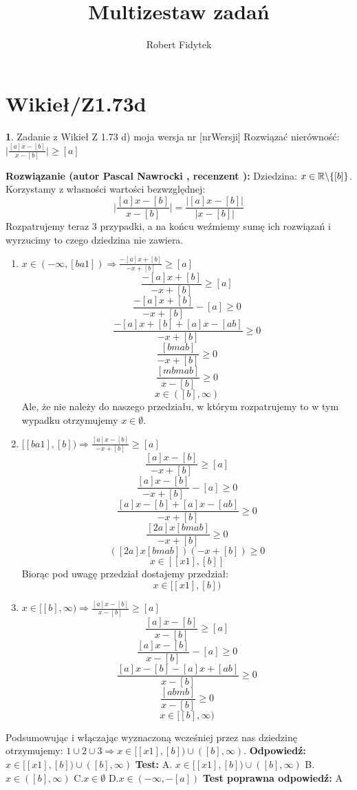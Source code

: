 \documentclass[12pt, a4paper]{article}
\title{Multizestaw zadań}
\author{Robert Fidytek}
\date{}
\theoremstyle{definition} %
\newtheorem{zad}{}
\newcommand{\kategoria}[1]{\section{#1}} %
\newcommand{\zadStart}[1]{\begin{zad}#1\newline} %
\newcommand{\zadStop}{\end{zad}}   %
\newcommand{\rozwStart}[2]{\noindent \textbf{Rozwiązanie (autor #1 , recenzent #2): }\newline} %
\newcommand{\rozwStop}{\newline}                                            %
\newcommand{\odpStart}{\noindent \textbf{Odpowiedź:}\newline}    %
\newcommand{\odpStop}{\newline}                                             %
\newcommand{\testStart}{\noindent \textbf{Test:}\newline} %
\newcommand{\testStop}{\newline} %
\newcommand{\kluczStart}{\noindent \textbf{Test poprawna odpowiedź:}\newline} %
\newcommand{\kluczStop}{\newline} %
\begin{document}
\maketitle


\kategoria{Wikieł/Z1.73d}
\zadStart{Zadanie z Wikieł Z 1.73 d) moja wersja nr [nrWersji]}
Rozwiązać nierówność: $\big|\frac{[a]x-[b]}{x-[b]}\big|\geq[a]$
\zadStop
\rozwStart{Pascal Nawrocki}{}
Dziedzina: $x\in\mathbb{R}\symbol{92}\{[b]\}$.
Korzystamy z własności wartości bezwzględnej:
$$\bigg|\frac{[a]x-[b]}{x-[b]}\bigg|=\frac{|[a]x-[b]|}{|x-[b]|}$$
Rozpatrujemy teraz 3 przypadki, a na końcu weźmiemy sumę ich rozwiązań i wyrzucimy to czego dziedzina nie zawiera.

\begin{enumerate}
\item $x\in(-\infty,[ba1])\Rightarrow\frac{-[a]x+[b]}{-x+[b]}\geq[a]$
$$\frac{-[a]x+[b]}{-x+[b]}\geq[a]$$
$$\frac{-[a]x+[b]}{-x+[b]}-[a]\geq0$$
$$\frac{-[a]x+[b]+[a]x-[ab]}{-x+[b]}\geq0$$
$$\frac{[bmab]}{-x+[b]}\geq0$$
$$\frac{[mbmab]}{x-[b]}\geq0$$
$$x\in([b],\infty)$$
Ale, że nie należy do naszego przedziału, w którym rozpatrujemy to w tym wypadku otrzymujemy $x\in\emptyset$.

\item $ [[ba1],[b])\Rightarrow\frac{[a]x-[b]}{-x+[b]}\geq[a]$
$$\frac{[a]x-[b]}{-x+[b]}\geq[a]$$
$$\frac{[a]x-[b]}{-x+[b]}-[a]\geq0$$
$$\frac{[a]x-[b]+[a]x-[ab]}{-x+[b]}\geq0$$
$$\frac{[2a]x[bmab]}{-x+[b]}\geq0$$
$$([2a]x[bmab])(-x+[b])\geq0$$
$$x\in[[x1],[b]]$$
Biorąc pod uwagę przedział dostajemy przedział:
$$x\in[[x1],[b])$$

\item $x\in[[b],\infty)\Rightarrow\frac{[a]x-[b]}{x-[b]}\geq[a]$
$$\frac{[a]x-[b]}{x-[b]}\geq[a]$$
$$\frac{[a]x-[b]}{x-[b]}-[a]\geq0$$
$$\frac{[a]x-[b]-[a]x+[ab]}{x-[b]}\geq0$$
$$\frac{[abmb]}{x-[b]}\geq0$$
$$x\in[[b],\infty)$$
\end{enumerate}
Podsumowując i włączając wyznaczoną wcześniej przez nas dziedzinę otrzymujemy: $1\cup2\cup3\Rightarrow x\in[[x1],[b])\cup([b],\infty)$.
\rozwStop
\odpStart
$x\in[[x1],[b])\cup([b],\infty)$
\odpStop
\testStart
A. $x\in[[x1],[b])\cup([b],\infty)$
B.$x\in([b],\infty)$
C.$x\in\emptyset$
D.$x\in(-\infty,-[a])$
\testStop
\kluczStart
A
\kluczStop
\end{document}

